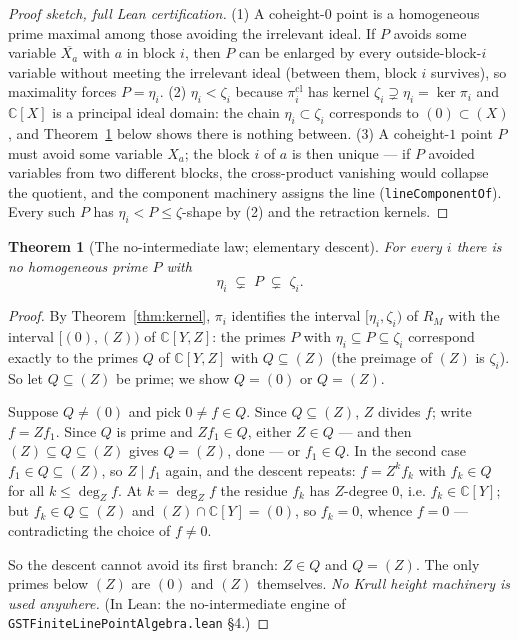 \documentclass[11pt,a4paper]{article}
\theoremstyle{plain}
\newtheorem{theorem}{Theorem}[section]
\theoremstyle{definition}
\newcommand{\C}{\mathbb{C}}
\begin{document}
\begin{proof}[Proof sketch, full Lean certification]
(1) A coheight-$0$ point is a homogeneous prime maximal among those
avoiding the irrelevant ideal.  If $P$ avoids some variable
$\overline{X_a}$ with $a$ in block $i$, then $P$ can be enlarged by
every outside-block-$i$ variable without meeting the irrelevant ideal
(between them, block $i$ survives), so maximality forces $P =
\eta_i$.  (2) $\eta_i < \zeta_i$ because
$\pi_i^{\mathrm{cl}}$ has kernel $\zeta_i \supsetneq \eta_i =
\ker\pi_i$ and $\C[X]$ is a principal ideal domain: the chain
$\eta_i \subset \zeta_i$ corresponds to $(0) \subset (X)$, and
Theorem~\ref{thm:no-intermediate} below shows there is nothing
between.  (3) A coheight-$1$ point $P$ must avoid some variable
$X_a$; the block $i$ of $a$ is then unique --- if $P$ avoided
variables from two different blocks, the cross-product vanishing
would collapse the quotient, and the component machinery assigns the
line (\texttt{lineComponentOf}).  Every such $P$ has
$\eta_i < P \le \zeta$-shape by (2) and the retraction kernels.
\end{proof}

\begin{theorem}[The no-intermediate law; elementary descent]
\label{thm:no-intermediate}
For every $i$ there is \emph{no} homogeneous prime $P$ with
\[
\eta_i \;\subsetneq\; P \;\subsetneq\; \zeta_i .
\]
\end{theorem}

\begin{proof}
By Theorem~\ref{thm:kernel}, $\pi_i$ identifies the interval
$[\eta_i, \zeta_i)$ of $R_M$ with the interval $[(0), (Z))$ of
$\C[Y,Z]$: the primes $P$ with $\eta_i \subseteq P \subseteq \zeta_i$
correspond exactly to the primes $Q$ of $\C[Y,Z]$ with $Q \subseteq
(Z)$ (the preimage of $(Z)$ is $\zeta_i$).  So let $Q \subseteq (Z)$
be prime; we show $Q = (0)$ or $Q = (Z)$.

Suppose $Q \ne (0)$ and pick $0 \ne f \in Q$.  Since $Q \subseteq
(Z)$, $Z$ divides $f$; write $f = Z f_1$.  Since $Q$ is prime and $Z
f_1 \in Q$, either $Z \in Q$ --- and then $(Z) \subseteq Q \subseteq
(Z)$ gives $Q = (Z)$, done --- or $f_1 \in Q$.  In the second case
$f_1 \in Q \subseteq (Z)$, so $Z \mid f_1$ again, and the descent
repeats: $f = Z^k f_k$ with $f_k \in Q$ for all $k \le \deg_Z f$.  At
$k = \deg_Z f$ the residue $f_k$ has $Z$-degree $0$, i.e. $f_k \in
\C[Y]$; but $f_k \in Q \subseteq (Z)$ and $(Z) \cap \C[Y] = (0)$, so
$f_k = 0$, whence $f = 0$ --- contradicting the choice of $f \ne 0$.

So the descent cannot avoid its first branch: $Z \in Q$ and $Q =
(Z)$.  The only primes below $(Z)$ are $(0)$ and $(Z)$
themselves.  \emph{No Krull height machinery is used anywhere.}  (In
Lean: the no-intermediate engine of
\texttt{GSTFiniteLinePointAlgebra.lean} \S4.)
\end{proof}
\end{document}
